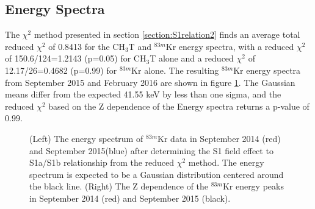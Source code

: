 \documentclass[a4paper,10pt,twocolumn]{article}
\begin{document}
\subsection{Energy Spectra}\label{Result:Spectra}

The $\chi^2$ method presented in section \ref{section:S1relation2} finds an average total reduced $\chi^2$ of 0.8413 for the CH$_3$T and $^{83m}$Kr energy spectra, with a reduced $\chi^2$ of  150.6/124=1.2143 (p=0.05) for CH$_3$T alone and a reduced $\chi^2$ of 12.17/26=0.4682 (p=0.99) for $^{83m}$Kr alone.  The resulting $^{83m}$Kr energy spectra from September 2015 and February 2016 are shown in figure \ref{Kr2p22_KrE}.  The Gaussian means differ from the expected 41.55 keV by less than one sigma, and the reduced $\chi^2$ based on the Z dependence of the Energy spectra returns a p-value of 0.99.

\begin{figure}
\centering
{}
\qquad
{}
\caption{ (Left) The energy spectrum of $^{83m}$Kr data in September 2014 (red) and September 2015(blue) after determining the S1 field effect to S1a/S1b relationship from the reduced $\chi^2$ method. The energy spectrum is expected to be a Gaussian distribution centered around the black line.  (Right) The Z dependence of the $^{83m}$Kr energy peaks in September 2014 (red) and September 2015 (black).}
\label{Kr2p22_KrE}
\end{figure}
\end{document}
